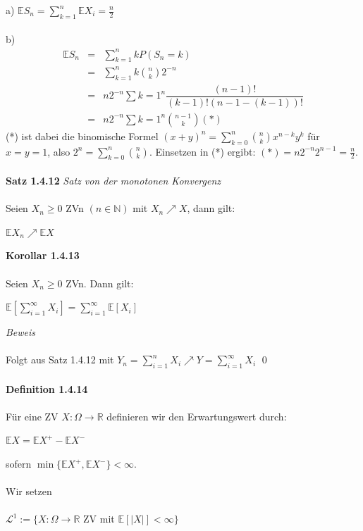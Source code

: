 \documentclass[10pt,a4paper]{report}
\numberwithin{equation}{section}
\numberwithin{figure}{section}
\theoremstyle{plain}
\theoremstyle{definition}
\theoremstyle{plain}
\theoremstyle{definition}
\theoremstyle{remark}
\theoremstyle{plain}
\theoremstyle{plain}
\theoremstyle{plain}
\newcommand{\1}{ \mathbb{1} } %
\begin{document}
a) $\mathbb{E}S_n=\sum\limits_{k=1}^n\mathbb{E}X_i=\frac{n}{2}$\\\\
b)\begin{eqnarray*}
\mathbb{E}S_n&=&\sum\limits_{k=1}^nkP(S_n=k)\\
&=& \sum\limits_{k=1}^nk\binom{n}{k}2^{-n}\\
&=& n 2^{-n} \sum\limits{k=1}^n\dfrac{(n-1)!}{(k-1)!(n-1-(k-1))!}\\
&=& n 2^{-n} \sum\limits{k=1}^n \binom{n-1}{k} (*)
\end{eqnarray*}
(*) ist dabei die binomische Formel $(x+y)^n=\sum\limits_{k=0}^n\binom{n}{k}x^{n-k}y^k$ für $x=y=1$, also $2^n=\sum\limits_{k=0}^n\binom{n}{k}$. Einsetzen in (*) ergibt: $(*)=n2^{-n}2^{n-1}=\frac{n}{2}$.\\\\
\textbf{Satz 1.4.12} \textit{Satz von der monotonen Konvergenz}\\\\
Seien $X_n\geq 0$ ZVn $(n \in \mathbb{N})$ mit $X_n \nearrow X$, dann gilt:
\begin{center}
$\mathbb{E}X_n \nearrow \mathbb{E}X$
\end{center} 
\textbf{Korollar 1.4.13}\\\\
Seien $X_n \geq 0$ ZVn. Dann gilt:
\begin{center}
$\mathbb{E}[\sum\limits_{i=1}^\infty X_i]=\sum\limits_{i=1}^\infty\mathbb{E}[X_i]$
\end{center}
\textit{Beweis}\\\\
Folgt aus Satz 1.4.12 mit $Y_n=\sum\limits_{i=1}^nX_i \nearrow Y= \sum\limits_{i=1}^\infty X_i$ \qed\\\\
\textbf{Definition 1.4.14}\\\\
Für eine ZV $X:\Omega \to \mathbb{R}$ definieren wir den Erwartungswert durch:
\begin{center}
$\mathbb{E}X=\mathbb{E}X^+-\mathbb{E}X^-$
\end{center} 
sofern $\min\{\mathbb{E}X^+,\mathbb{E}X^-\}<\infty$.\\\\
Wir setzen\\\\
$\mathcal{L}^1:=\{X:\Omega \to \mathbb{R}$ ZV mit $\mathbb{E}[|X|]< \infty \}$\\\\
\end{document}
